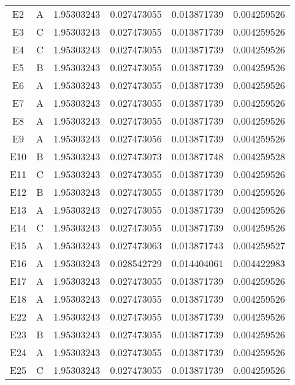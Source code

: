 \documentclass{cumcmthesis}
\begin{document}
\begin{appendices}
\begin{table}[H]
\begin{tabular}{cccccc}
E2 & A & 1.95303243 & 0.027473055 & 0.013871739 & 0.004259526 \\ 
E3 & C & 1.95303243 & 0.027473055 & 0.013871739 & 0.004259526 \\ 
E4 & C & 1.95303243 & 0.027473055 & 0.013871739 & 0.004259526 \\ 
E5 & B & 1.95303243 & 0.027473055 & 0.013871739 & 0.004259526 \\ 
E6 & A & 1.95303243 & 0.027473055 & 0.013871739 & 0.004259526 \\ 
E7 & A & 1.95303243 & 0.027473055 & 0.013871739 & 0.004259526 \\ 
E8 & A & 1.95303243 & 0.027473055 & 0.013871739 & 0.004259526 \\ 
E9 & A & 1.95303243 & 0.027473056 & 0.013871739 & 0.004259526 \\ 
E10 & B & 1.95303243 & 0.027473073 & 0.013871748 & 0.004259528 \\ 
E11 & C & 1.95303243 & 0.027473055 & 0.013871739 & 0.004259526 \\ 
E12 & B & 1.95303243 & 0.027473055 & 0.013871739 & 0.004259526 \\ 
E13 & A & 1.95303243 & 0.027473055 & 0.013871739 & 0.004259526 \\ 
E14 & C & 1.95303243 & 0.027473055 & 0.013871739 & 0.004259526 \\ 
E15 & A & 1.95303243 & 0.027473063 & 0.013871743 & 0.004259527 \\ 
E16 & A & 1.95303243 & 0.028542729 & 0.014404061 & 0.004422983 \\ 
E17 & A & 1.95303243 & 0.027473055 & 0.013871739 & 0.004259526 \\ 
E18 & A & 1.95303243 & 0.027473055 & 0.013871739 & 0.004259526 \\ 
E22 & A & 1.95303243 & 0.027473055 & 0.013871739 & 0.004259526 \\ 
E23 & B & 1.95303243 & 0.027473055 & 0.013871739 & 0.004259526 \\ 
E24 & A & 1.95303243 & 0.027473055 & 0.013871739 & 0.004259526 \\ 
E25 & C & 1.95303243 & 0.027473055 & 0.013871739 & 0.004259526 \\ 
		\bottomrule[1.5pt]
\end{tabular}
\end{table}


\end{appendices}
\end{document}
